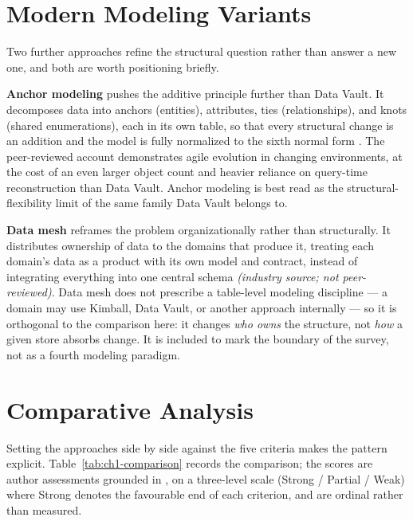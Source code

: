 \section{Modern Modeling Variants}
\label{sec:ch1-variants}

Two further approaches refine the structural question rather than answer a new one, and both are worth positioning briefly.

\textbf{Anchor modeling} pushes the additive principle further than Data Vault. It decomposes data into anchors (entities), attributes, ties (relationships), and knots (shared enumerations), each in its own table, so that every structural change is an addition and the model is fully normalized to the sixth normal form \parencite{ronnback2010anchor}. The peer-reviewed account demonstrates agile evolution in changing environments, at the cost of an even larger object count and heavier reliance on query-time reconstruction than Data Vault. Anchor modeling is best read as the structural-flexibility limit of the same family Data Vault belongs to.

\textbf{Data mesh} reframes the problem organizationally rather than structurally. It distributes ownership of data to the domains that produce it, treating each domain's data as a product with its own model and contract, instead of integrating everything into one central schema \parencite{dehghani2022mesh} \textit{(industry source; not peer-reviewed)}. Data mesh does not prescribe a table-level modeling discipline --- a domain may use Kimball, Data Vault, or another approach internally --- so it is orthogonal to the comparison here: it changes \textit{who owns} the structure, not \textit{how} a given store absorbs change. It is included to mark the boundary of the survey, not as a fourth modeling paradigm.

\section{Comparative Analysis}
\label{sec:ch1-comparison}

Setting the approaches side by side against the five criteria makes the pattern explicit. Table~\ref{tab:ch1-comparison} records the comparison; the scores are author assessments grounded in \parencite{inmon2005, kimball2013, linstedt2015, ronnback2010anchor}, on a three-level scale (Strong / Partial / Weak) where Strong denotes the favourable end of each criterion, and are ordinal rather than measured.

